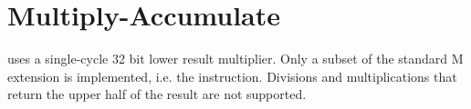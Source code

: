 \chapter{Multiply-Accumulate}
\label{chap:mac}

\rvcore uses a single-cycle 32 bit lower result multiplier. Only a subset of the
standard M extension is implemented, i.e. the  instruction.
Divisions and multiplications that return the upper half of the result are not
supported.
